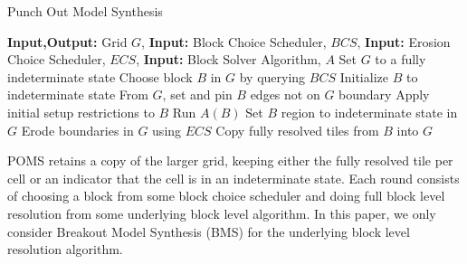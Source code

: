 

\begin{algorithm}
  \caption{Punch Out Model Synthesis}
  \label{alg:POMS}
  \begin{algorithmic}
    \State \textbf{Input,Output:} Grid $G$,
    \State \textbf{Input:} Block Choice Scheduler, $BCS$,
    \State \textbf{Input:} Erosion Choice Scheduler, $ECS$,
    \State \textbf{Input:} Block Solver Algorithm, $A$
    \State Set $G$ to a fully indeterminate state
      \State Choose block $B$ in $G$ by querying $BCS$
      \State Initialize $B$ to indeterminate state
      \State From $G$, set and pin $B$ edges not on $G$ boundary
      \State Apply initial setup restrictions to $B$
      \State Run $A(B)$ 
        \State Set $B$ region to indeterminate state in $G$
        \State Erode boundaries in $G$ using $ECS$
      \Else {}
        \State Copy fully resolved tiles from $B$ into $G$
      \EndIf

    \EndWhile

  \end{algorithmic}
\end{algorithm}


POMS retains a copy of the larger grid, keeping either the fully resolved
tile per cell or an indicator that the cell is in an indeterminate state.
Each round consists of choosing a block from some block choice scheduler 
and doing full block level resolution from some underlying block level algorithm.
In this paper, we only consider Breakout Model Synthesis (BMS) \cite{Hoetzlein_2023}
for the underlying block level resolution algorithm.



